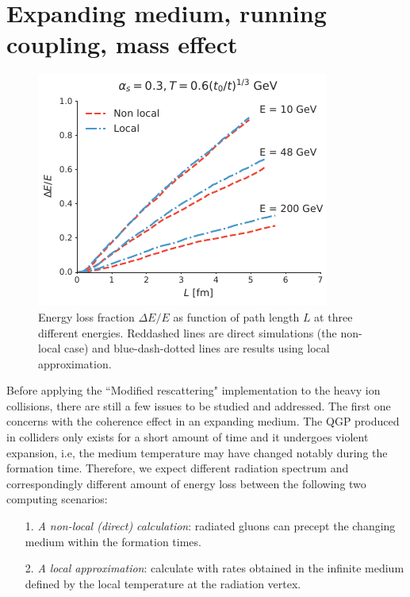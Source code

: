 \documentclass[aps, prc, reprint, amsmath, groupedaddress, nofootinbib]{revtex4-1}
\begin{document}
\section{Expanding medium, running coupling, mass effect}\label{section:disscuss}
\begin{figure}
\includegraphics[width=\columnwidth]{Bjorken.pdf}
\caption{Energy loss fraction $\Delta E /E$ as function of path length $L$ at three different energies. Reddashed lines are direct simulations (the non-local case) and blue-dash-dotted lines are results using local approximation.}
\label{fig:Bjorken}
\end{figure}
Before applying the ``Modified rescattering" implementation to the heavy ion collisions, there are still a few issues to be studied and addressed.
The first one concerns with the coherence effect in an expanding medium. 
The QGP produced in colliders only exists for a short amount of time and it undergoes violent expansion, i.e, the medium temperature may have changed notably during the formation time.
Therefore, we expect different radiation spectrum and correspondingly different amount of energy loss between the following two computing scenarios:
\begin{itemize}
\item[1.]  {\it A non-local (direct) calculation}: radiated gluons can precept the changing medium within the formation times.
\item[2.] {\it A local approximation}: calculate with rates obtained in the infinite medium defined by the local temperature at the radiation vertex.
\end{itemize} 
\end{document}
